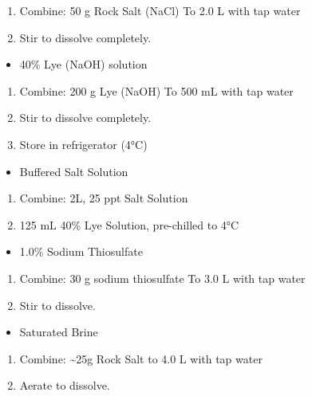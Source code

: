 \documentclass[
]{book}
\providecommand{\tightlist}{%
  \setlength{\itemsep}{0pt}\setlength{\parskip}{0pt}}
\begin{document}
\begin{enumerate}
\def\labelenumi{\arabic{enumi}.}
\tightlist
\item
  Combine: 50 g Rock Salt (NaCl) To 2.0 L with tap water
\item
  Stir to dissolve completely.
\end{enumerate}

\begin{itemize}
\tightlist
\item
  40\% Lye (NaOH) solution
\end{itemize}

\begin{enumerate}
\def\labelenumi{\arabic{enumi}.}
\tightlist
\item
  Combine: 200 g Lye (NaOH) To 500 mL with tap water
\item
  Stir to dissolve completely.
\item
  Store in refrigerator (4°C)
\end{enumerate}

\begin{itemize}
\tightlist
\item
  Buffered Salt Solution
\end{itemize}

\begin{enumerate}
\def\labelenumi{\arabic{enumi}.}
\tightlist
\item
  Combine: 2L, 25 ppt Salt Solution
\item
  125 mL 40\% Lye Solution, pre-chilled to 4°C
\end{enumerate}

\begin{itemize}
\tightlist
\item
  1.0\% Sodium Thiosulfate
\end{itemize}

\begin{enumerate}
\def\labelenumi{\arabic{enumi}.}
\tightlist
\item
  Combine: 30 g sodium thiosulfate To 3.0 L with tap water
\item
  Stir to dissolve.
\end{enumerate}

\begin{itemize}
\tightlist
\item
  Saturated Brine
\end{itemize}

\begin{enumerate}
\def\labelenumi{\arabic{enumi}.}
\tightlist
\item
  Combine: \textasciitilde25g Rock Salt to 4.0 L with tap water
\item
  Aerate to dissolve.
\end{enumerate}
\end{document}
